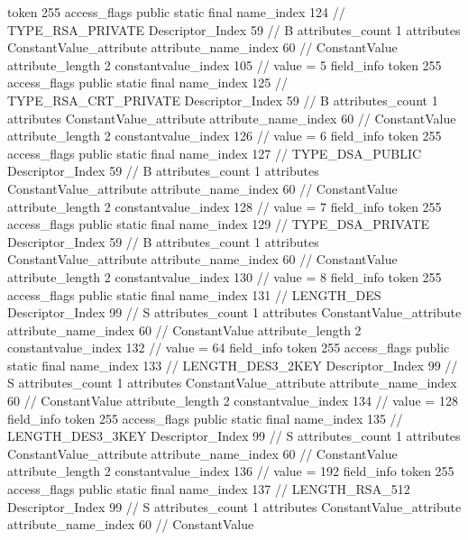 {{{{{				token	255
				access_flags	public static final
				name_index	124		// TYPE_RSA_PRIVATE
				Descriptor_Index	59		// B
				attributes_count	1
				attributes {
				ConstantValue_attribute {
					attribute_name_index	60		// ConstantValue
					attribute_length	2
					constantvalue_index	105		// value = 5
				}
				}
			}
			field_info {
				token	255
				access_flags	public static final
				name_index	125		// TYPE_RSA_CRT_PRIVATE
				Descriptor_Index	59		// B
				attributes_count	1
				attributes {
				ConstantValue_attribute {
					attribute_name_index	60		// ConstantValue
					attribute_length	2
					constantvalue_index	126		// value = 6
				}
				}
			}
			field_info {
				token	255
				access_flags	public static final
				name_index	127		// TYPE_DSA_PUBLIC
				Descriptor_Index	59		// B
				attributes_count	1
				attributes {
				ConstantValue_attribute {
					attribute_name_index	60		// ConstantValue
					attribute_length	2
					constantvalue_index	128		// value = 7
				}
				}
			}
			field_info {
				token	255
				access_flags	public static final
				name_index	129		// TYPE_DSA_PRIVATE
				Descriptor_Index	59		// B
				attributes_count	1
				attributes {
				ConstantValue_attribute {
					attribute_name_index	60		// ConstantValue
					attribute_length	2
					constantvalue_index	130		// value = 8
				}
				}
			}
			field_info {
				token	255
				access_flags	public static final
				name_index	131		// LENGTH_DES
				Descriptor_Index	99		// S
				attributes_count	1
				attributes {
				ConstantValue_attribute {
					attribute_name_index	60		// ConstantValue
					attribute_length	2
					constantvalue_index	132		// value = 64
				}
				}
			}
			field_info {
				token	255
				access_flags	public static final
				name_index	133		// LENGTH_DES3_2KEY
				Descriptor_Index	99		// S
				attributes_count	1
				attributes {
				ConstantValue_attribute {
					attribute_name_index	60		// ConstantValue
					attribute_length	2
					constantvalue_index	134		// value = 128
				}
				}
			}
			field_info {
				token	255
				access_flags	public static final
				name_index	135		// LENGTH_DES3_3KEY
				Descriptor_Index	99		// S
				attributes_count	1
				attributes {
				ConstantValue_attribute {
					attribute_name_index	60		// ConstantValue
					attribute_length	2
					constantvalue_index	136		// value = 192
				}
				}
			}
			field_info {
				token	255
				access_flags	public static final
				name_index	137		// LENGTH_RSA_512
				Descriptor_Index	99		// S
				attributes_count	1
				attributes {
				ConstantValue_attribute {
					attribute_name_index	60		// ConstantValue
}}}}}}}
